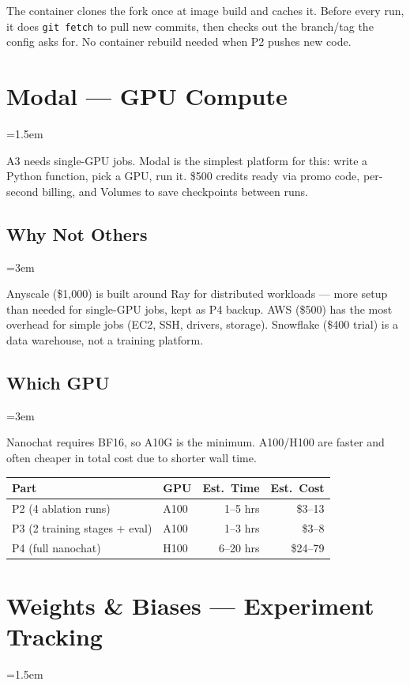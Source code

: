 \documentclass[9pt]{extarticle}
\begin{document}
The container clones the fork once at image build and caches it. Before every run, it does \texttt{git fetch} to pull new commits, then checks out the branch/tag the config asks for. No container rebuild needed when P2 pushes new code.

\leftskip=0pt
\section*{Modal --- GPU Compute}
\leftskip=1.5em

A3 needs single-GPU jobs. Modal is the simplest platform for this: write a Python function, pick a GPU, run it. \$500 credits ready via promo code, per-second billing, and Volumes to save checkpoints between runs.

\subsection*{Why Not Others}
\leftskip=3em

Anyscale (\$1{,}000) is built around Ray for distributed workloads --- more setup than needed for single-GPU jobs, kept as P4 backup. AWS (\$500) has the most overhead for simple jobs (EC2, SSH, drivers, storage). Snowflake (\$400 trial) is a data warehouse, not a training platform.

\subsection*{Which GPU}
\leftskip=3em

Nanochat requires BF16, so A10G is the minimum. A100/H100 are faster and often cheaper in total cost due to shorter wall time.

\begin{tabular}{@{}llrr@{}}
\toprule
Part & GPU & Est.\ Time & Est.\ Cost \\
\midrule
P2 (4 ablation runs) & A100 & 1--5 hrs & \$3--13 \\
P3 (2 training stages + eval) & A100 & 1--3 hrs & \$3--8 \\
P4 (full nanochat) & H100 & 6--20 hrs & \$24--79 \\
\bottomrule
\end{tabular}

\leftskip=0pt
\section*{Weights \& Biases --- Experiment Tracking}
\leftskip=1.5em
\end{document}
